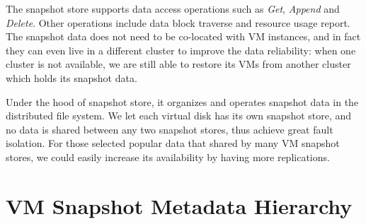 The snapshot store 
supports data access operations such as \emph{Get}, \emph{Append} and \emph{Delete}.
Other operations include data block traverse and resource usage report.
The snapshot data does not need to be
co-located with VM instances, and in fact they can even live in a different cluster to improve the 
data reliability: when one cluster is not available, we are still able to restore its VMs from another cluster which
holds its snapshot data. 

Under the hood of snapshot store, it organizes and operates snapshot data 
in the distributed file system. We let each virtual disk has its own snapshot store, 
and no data is shared between
any two snapshot stores, thus achieve great fault isolation. For those selected popular data
that shared by many VM snapshot stores, we could easily increase its availability by having more replications.




\section{VM Snapshot Metadata Hierarchy}
\label{overview:meta}

